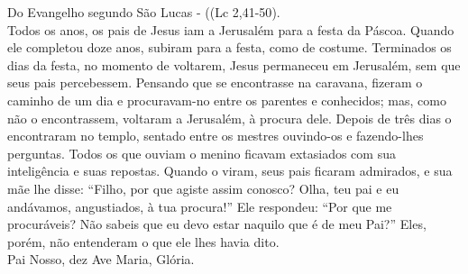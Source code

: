 \documentclass{book}
\begin{document}
\begin{flushleft}
    Do Evangelho segundo São Lucas - (\textcolor{VioletRed2}{(Lc 2,41-50}). \\
    \hfill{} \break{}
    Todos os anos, os pais de Jesus iam a Jerusalém para a festa da Páscoa. Quando ele completou doze anos, subiram para a festa, como de costume. Terminados os dias da festa, no momento de voltarem, Jesus permaneceu em Jerusalém, sem que seus pais percebessem. Pensando que se encontrasse na caravana, fizeram o caminho de um dia e procuravam-no entre os parentes e conhecidos; mas, como não o encontrassem, voltaram a Jerusalém, à procura dele. Depois de três dias o encontraram no templo, sentado entre os mestres ouvindo-os e fazendo-lhes perguntas. Todos os que ouviam o menino ficavam extasiados com sua inteligência e suas repostas. Quando o viram, seus pais ficaram admirados, e sua mãe lhe disse: ``Filho, por que agiste assim conosco? Olha, teu pai e eu andávamos, angustiados, à tua procura!'' Ele respondeu: ``Por que me procuráveis? Não sabeis que eu devo estar naquilo que é de meu Pai?'' Eles, porém, não entenderam o que ele lhes havia dito. \\
    \hfill{} \break{}
    Pai Nosso, dez Ave Maria, Glória.
\end{flushleft}
\end{document}

